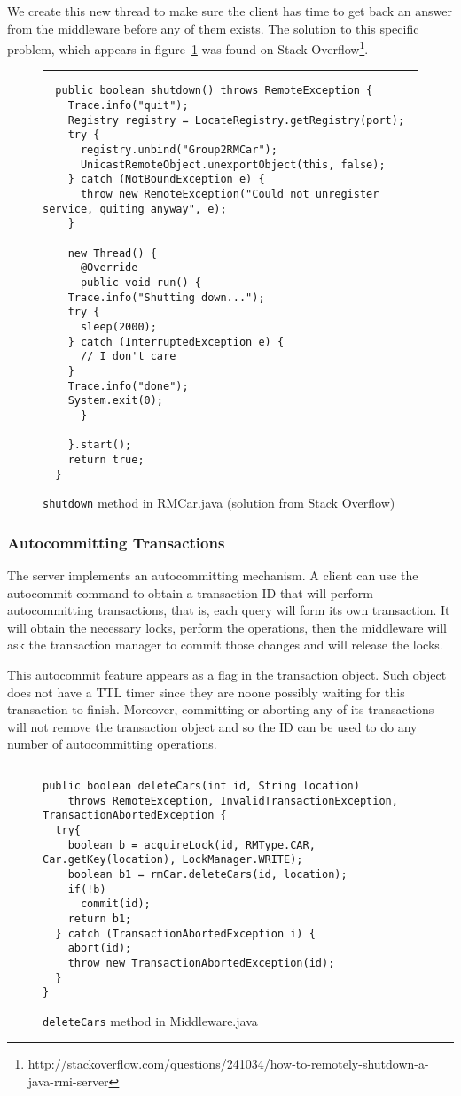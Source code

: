 \documentclass[12pt]{article}
\theoremstyle{plain}%
\theoremstyle{definition}
\theoremstyle{remark}
\newcommand{\java}[1]{{\lstinline!#1!}}
\newenvironment{figureone}[1]{%
  \def\deffigurecaption{#1}%
  \begin{figure}[htbp]%
  \begin{center}%
  \begin{minipage}{\columnwidth}%
  \hrule \vspace*{2ex}%
}{%
  \end{minipage}%
  \end{center}%
  \caption{\deffigurecaption}%
  \end{figure}%
}
\begin{document}
We create this new thread to make sure the client has time to get back an answer from the middleware before any of them exists. The solution to this specific problem, which appears in figure~\ref{fig:shutdown} was found on Stack Overflow\footnote{http://stackoverflow.com/questions/241034/how-to-remotely-shutdown-a-java-rmi-server}.

\begin{figureone}{\java{shutdown} method in RMCar.java (solution from Stack Overflow) \label{fig:shutdown}}
\begin{lstlisting}
  public boolean shutdown() throws RemoteException {
    Trace.info("quit");
    Registry registry = LocateRegistry.getRegistry(port);
    try {
      registry.unbind("Group2RMCar");
      UnicastRemoteObject.unexportObject(this, false);
    } catch (NotBoundException e) {
      throw new RemoteException("Could not unregister service, quiting anyway", e);
    }

    new Thread() {
      @Override
      public void run() {
	Trace.info("Shutting down...");
	try {
	  sleep(2000);
	} catch (InterruptedException e) {
	  // I don't care
	}
	Trace.info("done");
	System.exit(0);
      }

    }.start();
    return true;
  }
\end{lstlisting}
\end{figureone}

\subsubsection*{Autocommitting Transactions}

The server implements an autocommitting mechanism. A client can use the autocommit command to obtain a transaction ID that will perform autocommitting transactions, that is, each query will form its own transaction. It will obtain the necessary locks, perform the operations, then the middleware will ask the transaction manager to commit those changes and will release the locks. 

This autocommit feature appears as a flag in the transaction object. Such object does not have a TTL timer since they are noone possibly waiting for this transaction to finish. Moreover, committing or aborting any of its transactions will not remove the transaction object and so the ID can be used to do any number of autocommitting operations.  


\begin{figureone}{\java{deleteCars} method in Middleware.java \label{fig:operation}}
\begin{lstlisting}
public boolean deleteCars(int id, String location)
    throws RemoteException, InvalidTransactionException, TransactionAbortedException {
  try{
    boolean b = acquireLock(id, RMType.CAR, Car.getKey(location), LockManager.WRITE);
    boolean b1 = rmCar.deleteCars(id, location);
    if(!b)
      commit(id);
    return b1;
  } catch (TransactionAbortedException i) {
    abort(id);
    throw new TransactionAbortedException(id);
  }
}
\end{lstlisting}
\end{figureone}
\end{document}
